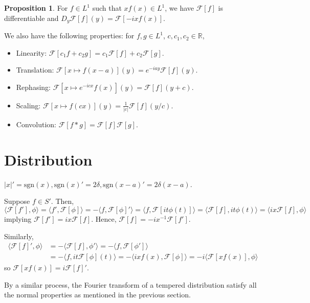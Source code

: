 \documentclass[]{article}
\theoremstyle{definition}
\newtheorem*{proposition}{Proposition}
\begin{document}
\begin{proposition}
  For \(f \in L^1\) such that \(xf(x) \in L^1\), we have \(\mathcal{F}[f]\) is 
  differentiable and \(D_y\mathcal{F}[f](y) = \mathcal{F}[-ixf(x)]\).
\end{proposition}

We also have the following properties: for \(f, g \in L^1\), \(c, c_1, c_2 \in \mathbb{R}\),
\begin{itemize}
  \item Linearity: \(\mathcal{F}[c_1 f + c_2 g] = c_1\mathcal{F}[f] + c_2 \mathcal{F}[g]\).
  \item Translation: \(\mathcal{F}[x \mapsto f(x - a)](y) = e^{-iay} \mathcal{F}[f](y)\).
  \item Rephasing: \(\mathcal{F}[x \mapsto e^{-icx}f(x)](y) = \mathcal{F}[f](y + c)\).
  \item Scaling: \(\mathcal{F}[x \mapsto f(cx)](y) = \frac{1}{|c|} \mathcal{F}[f](y / c)\).
  \item Convolution: \(\mathcal{F}[f * g] = \mathcal{F}[f] \mathcal{F}[g]\).
\end{itemize}

\section*{Distribution}

\(|x|' = \text{sgn}(x), \text{sgn}(x)' = 2\delta, \text{sgn}(x - a)' = 2\delta(x - a)\).

Suppose \(f \in S'\). Then,
\[\langle \mathcal{F}[f'], \phi\rangle = \langle f', \mathcal{F}[\phi]\rangle 
  = - \langle f, \mathcal{F}[\phi]'\rangle
  = \langle f, \mathcal{F}[it\phi(t)]\rangle = \langle \mathcal{F}[f], it\phi(t)\rangle
  = \langle ix \mathcal{F}[f], \phi\rangle\]
implying \(\mathcal{F}[f'] = ix \mathcal{F}[f]\). Hence, \(\mathcal{F}[f] = -ix^{-1}\mathcal{F}[f']\).

Similarly,
\[\begin{split} 
    \langle \mathcal{F}[f]', \phi \rangle & = - \langle \mathcal{F}[f], \phi'\rangle 
    = - \langle f, \mathcal{F}[\phi'] \rangle\\
    & = -\langle f, it \mathcal{F}[\phi](t)\rangle
    = - \langle ixf(x), \mathcal{F}[\phi] \rangle = -i \langle \mathcal{F}[xf(x)], \phi \rangle
\end{split}\]
so \(\mathcal{F}[xf(x)] = i \mathcal{F}[f]'\).

By a similar process, the Fourier transform of a tempered distribution satisfy 
all the normal properties as mentioned in the previous section.
\end{document}
